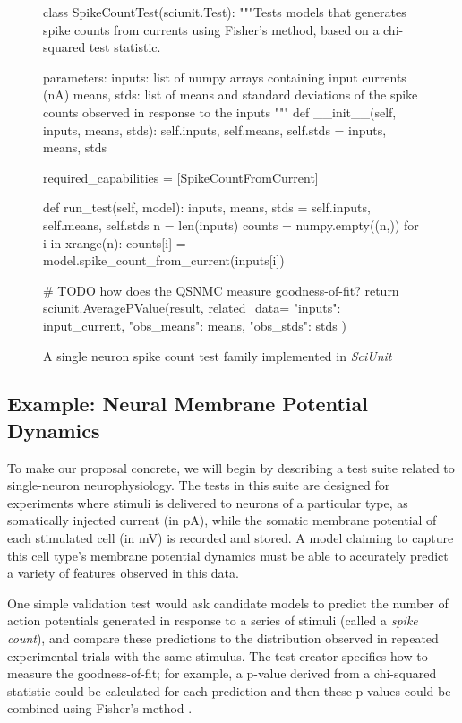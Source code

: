 \documentclass[11pt,letterpaper]{article}
\begin{document}
\begin{figure}
\small
\begin{python}
class SpikeCountTest(sciunit.Test):
  """Tests models that generates spike counts from currents using
  Fisher's method, based on a chi-squared test statistic.

  parameters:
    inputs: list of numpy arrays containing input currents (nA)
    means, stds: list of means and standard deviations of the 
      spike counts observed in response to the inputs
  """
  def __init__(self, inputs, means, stds):
    self.inputs, self.means, self.stds = inputs, means, stds
	
  required_capabilities = [SpikeCountFromCurrent]
	
  def run_test(self, model):
    inputs, means, stds = self.inputs, self.means, self.stds
    n = len(inputs)
    counts = numpy.empty((n,))
    for i in xrange(n):
      counts[i] = model.spike_count_from_current(inputs[i])
      
    # TODO how does the QSNMC measure goodness-of-fit?
    return sciunit.AveragePValue(result, related_data={
      "inputs": input_current,
      "obs_means": means,
      "obs_stds": stds
    })
\end{python}
\vspace{-5px}
\caption{A single neuron spike count test family implemented in \textit{SciUnit}}
\label{fig:rate_test}
\vspace{-10px}
\end{figure}
\subsection{Example: Neural Membrane Potential Dynamics} To make our proposal concrete, we will begin by describing a test suite related to single-neuron neurophysiology. The tests in this suite are designed for experiments where stimuli is delivered to neurons of a particular type, as somatically injected current (in pA), while the somatic membrane potential of each stimulated cell (in mV) is recorded and stored.  A model claiming to capture this cell type's membrane potential dynamics must be able to accurately predict a variety of features observed in this data.

One simple validation test would ask candidate models to predict the number of action potentials generated in response to a series of stimuli (called a \emph{spike count}), and compare these predictions to the distribution observed in repeated experimental trials with the same stimulus. The test creator specifies how to measure the goodness-of-fit; for example, a p-value derived from a chi-squared statistic could be calculated for each prediction and then these p-values could be combined using Fisher's method \cite{statbook}.
\end{document}

